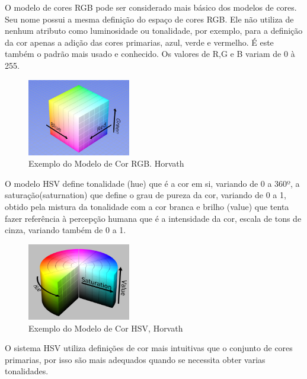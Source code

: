 O modelo de cores RGB pode ser considerado mais básico dos modelos de cores. Seu nome possui a mesma definição do espaço de cores RGB. Ele não utiliza de nenhum atributo como luminosidade ou tonalidade, por exemplo, para a definição da cor apenas a adição das cores primarias, azul, verde e vermelho. É este também o padrão mais usado e conhecido. Os valores de R,G e B variam de 0 à 255.


\begin{figure}[!h]
	\centering
	\includegraphics[width=0.4\textwidth]{rgb.pdf}
	
\caption{Exemplo do Modelo de Cor RGB.	 Horvath\cite{ImagensHSLHSVRGB}  }
	\label{ModeloRGB}
\end{figure}



O modelo HSV define tonalidade (hue) que é a cor em si, variando de 0 a 360º, a saturação(saturnation) que define o grau de pureza da cor, variando de 0 a 1, obtido pela mistura da tonalidade com a cor branca e brilho (value) que tenta fazer referência à percepção humana\cite{Leao:2005} que é a intensidade da cor, escala de tons de cinza\cite{Azevedo:2003}, variando também de 0 a 1.


\begin{figure}[!h]
	\centering
	\includegraphics[width=0.4\textwidth]{hsv.pdf}
	
	\caption{Exemplo do Modelo de Cor HSV, Horvath\cite{ImagensHSLHSVRGB}}
	\label{ModeloHSV}
\end{figure} 


O sistema HSV utiliza definições de cor mais intuitivas que o conjunto de cores primarias, por isso são mais adequados quando se necessita obter varias tonalidades.

